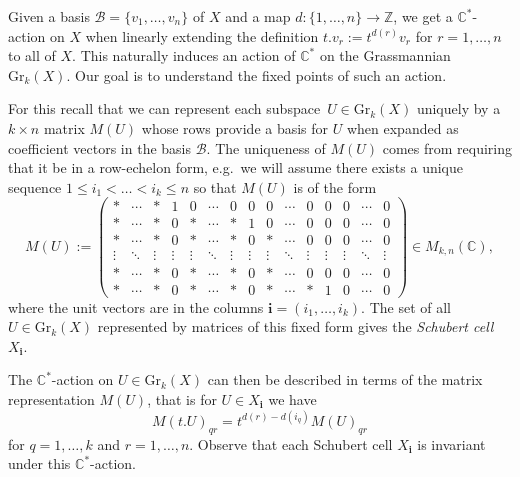 \documentclass[smallextended,envcountsect,envcountsame]{svjour3}
\numberwithin{equation}{section}
\newcommand{\C}{\mathbb{C}}
\newcommand{\CC}{\mathbb{C}}
\newcommand{\ZZ}{\mathbb{Z}}
\newcommand{\bfi}{\mathbf{i}}
\newcommand{\Gr}{\mathrm{Gr}}
\begin{document}
Given a basis $\mathcal B=\{v_1,\ldots,v_n\}$ of $X$ and a map $d:\{1,\ldots,n\}\to\ZZ$, we get a $\C^\ast$-action on $X$ when linearly extending the definition $t.v_r:=t^{d(r)}v_r$ for $r=1,\ldots,n$ to all of $X$.
This naturally induces an action of $\C^\ast$ on the Grassmannian $\Gr_k(X)$.
Our goal is to understand the fixed points of such an action.

For this recall that we can represent each subspace~$U\in\Gr_k(X)$ uniquely by a $k\times n$ matrix $M(U)$ whose rows provide a basis for $U$ when expanded as coefficient vectors in the basis $\mathcal B$.
The uniqueness of $M(U)$ comes from requiring that it be in a row-echelon form, e.g.\ we will assume there exists a unique sequence $1\leq i_1<\ldots<i_k\leq n$ so that $M(U)$ is of the form
\[M(U):=
  \begin{pmatrix}
    \ast&\cdots &\ast &1&0 &\cdots& 0 & 0 & 0 &\cdots&0&0&0&\cdots&0\\
    \ast&\cdots &\ast&0&\ast&\cdots &\ast&1&0&\cdots&0&0&0&\cdots&0\\
    \ast &\cdots&\ast&0&\ast &\cdots&\ast&0&\ast&\cdots&0&0&0&\cdots&0\\[-0.4em]
    \vdots &\ddots&\vdots&\vdots&\vdots &\ddots&\vdots&\vdots&\vdots&\ddots&\vdots&\vdots&\vdots&\ddots&\vdots\\
    \ast&\cdots &\ast&0&\ast&\cdots &\ast&0&\ast&\cdots&0&0&0&\cdots&0\\
    \ast&\cdots &\ast&0&\ast&\cdots &\ast&0&\ast&\cdots&\ast&1&0&\cdots&0
  \end{pmatrix}\in M_{k,n}(\CC),\]
where the unit vectors are in the columns $\bfi=(i_1,\ldots,i_k)$.
The set of all $U\in\Gr_k(X)$ represented by matrices of this fixed form gives the \emph{Schubert cell} $X_\bfi$.

The $\C^\ast$-action on $U\in\Gr_k(X)$ can then be described in terms of the matrix representation $M(U)$, that is for $U\in X_\bfi$ we have
\[M(t.U)_{qr}=t^{d(r)-d(i_q)} M(U)_{qr}\]
for $q=1,\ldots,k$ and $r=1,\ldots,n$.
Observe that each Schubert cell $X_\bfi$ is invariant under this $\CC^*$-action.
\end{document}
